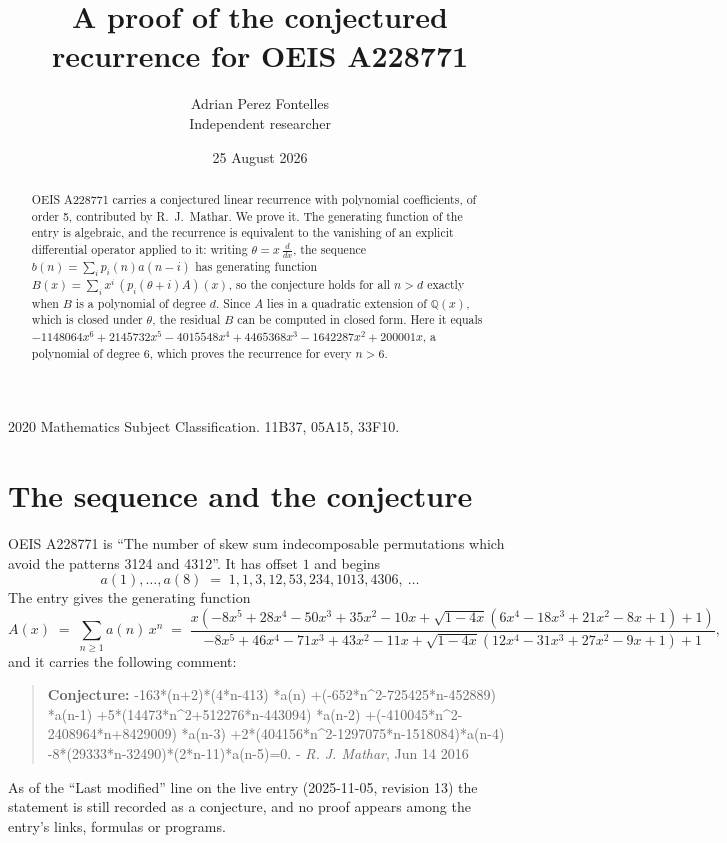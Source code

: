 \documentclass[11pt,a4paper]{article}
\title{A proof of the conjectured recurrence for OEIS A228771}
\author{Adrian Perez Fontelles\\ \small Independent researcher}
\date{25 August 2026}
\theoremstyle{plain}
\theoremstyle{definition}
\begin{document}
\maketitle

\begin{abstract}
OEIS A228771 carries a conjectured linear recurrence with polynomial coefficients, of
order 5, contributed by R.~J.~Mathar. We prove it. The generating function of the
entry is algebraic, and the recurrence is equivalent to the vanishing of an explicit
differential operator applied to it: writing $\theta=x\,\frac{d}{dx}$, the sequence
$b(n)=\sum_{i}p_{i}(n)a(n-i)$ has generating function
$B(x)=\sum_{i}x^{i}\,(p_{i}(\theta+i)A)(x)$, so the conjecture holds for all $n>d$ exactly
when $B$ is a polynomial of degree $d$. Since $A$ lies in a quadratic extension of
$\mathbb{Q}(x)$, which is closed under $\theta$, the residual $B$ can be computed in
closed form. Here it equals $- 1148064 x^{6} + 2145732 x^{5} - 4015548 x^{4} + 4465368 x^{3} - 1642287 x^{2} + 200001 x$, a polynomial of degree $6$, which proves
the recurrence for every $n>6$.
\end{abstract}

\noindent\small 2020 Mathematics Subject Classification. 11B37, 05A15, 33F10.\normalsize

\section{The sequence and the conjecture}

OEIS A228771 is ``The number of skew sum indecomposable permutations which avoid the patterns 3124 and 4312''. It has offset $1$ and begins
\[
a(1),\dots,a(8)\;=\;1, 1, 3, 12, 53, 234, 1013, 4306,\ \dots
\]
The entry gives the generating function
\begin{equation}\label{eq:gf}
A(x)\;=\;\sum_{n\ge 1} a(n)\,x^{n}\;=\;\frac{x \left(- 8 x^{5} + 28 x^{4} - 50 x^{3} + 35 x^{2} - 10 x + \sqrt{1 - 4 x} \left(6 x^{4} - 18 x^{3} + 21 x^{2} - 8 x + 1\right) + 1\right)}{- 8 x^{5} + 46 x^{4} - 71 x^{3} + 43 x^{2} - 11 x + \sqrt{1 - 4 x} \left(12 x^{4} - 31 x^{3} + 27 x^{2} - 9 x + 1\right) + 1} ,
\end{equation}
and it carries the following comment:
\begin{quote}\small
\textbf{Conjecture:} -163*(n+2)*(4*n-413) *a(n) +(-652*n\^{}2-725425*n-452889) *a(n-1) +5*(14473*n\^{}2+512276*n-443094) *a(n-2) +(-410045*n\^{}2-2408964*n+8429009) *a(n-3) +2*(404156*n\^{}2-1297075*n-1518084)*a(n-4) -8*(29333*n-32490)*(2*n-11)*a(n-5)=0. - \emph{R. J. Mathar}, Jun 14 2016
\end{quote}
As of the ``Last modified'' line on the live entry (2025-11-05, revision 13) the
statement is still recorded as a conjecture, and no proof appears among the entry's links,
formulas or programs.
\end{document}
